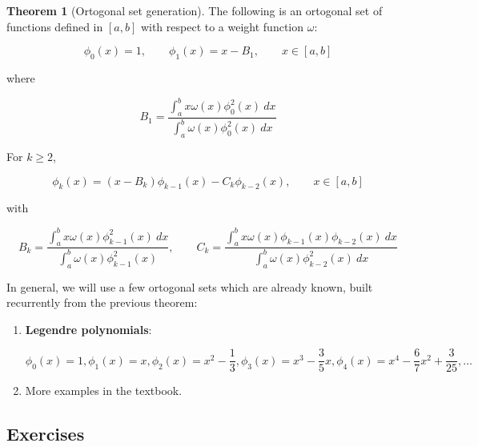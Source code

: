 \documentclass[12pt]{article}
\theoremstyle{definition}
\newtheorem{theorem}{Theorem}
\begin{document}
\begin{theorem}[Ortogonal set generation]
    The following is an ortogonal set of functions defined in $[a, b]$ with 
    respect to a weight function $\omega$: 

    \begin{equation*}
        \phi_0(x) = 1, \qquad \phi_1(x) = x-B_1, \qquad x \in [a, b]
    \end{equation*}

    where 

    \begin{equation*}
        B_1 = \frac{\int_a^b x \omega(x) \phi_0^2(x) ~ dx}{\int_a^b \omega(x)
        \phi_0^2(x) ~ dx}
    \end{equation*}

    For $k \geq 2$, 

    \begin{equation*}
        \phi_k(x) = (x - B_k) \phi_{k-1}(x) - C_k \phi_{k-2}(x), \qquad x \in
        [a, b]
    \end{equation*}

    with 

    \begin{equation*}
        B_k = \frac{\int_a^b x \omega(x) \phi^2_{k-1}(x) ~ dx}{\int_a^b
        \omega(x) \phi^2_{k-1}(x)}, \qquad C_k = \frac{\int_a^b x \omega(x)
    \phi_{k-1}(x) \phi_{k-2}(x) ~ dx}{\int_a^b \omega(x) \phi^2_{k-2}(x) ~ dx}
    \end{equation*}
\end{theorem}

In general, we will use a few ortogonal sets which are already known, built
recurrently from the previous theorem: 

\begin{enumerate}
    \item \textbf{Legendre polynomials}:

        \begin{equation*}
            \phi_0(x) = 1, \phi_1(x) = x, \phi_2(x) = x^2 - \frac{1}{3},
            \phi_3(x) = x^3 - \frac{3}{5}x, \phi_4(x) = x^4 - \frac{6}{7}x^2 +
            \frac{3}{25}, \ldots
        \end{equation*}

    \item More examples in the textbook.

\end{enumerate}

\pagebreak 

\subsection{Exercises}
\end{document}
